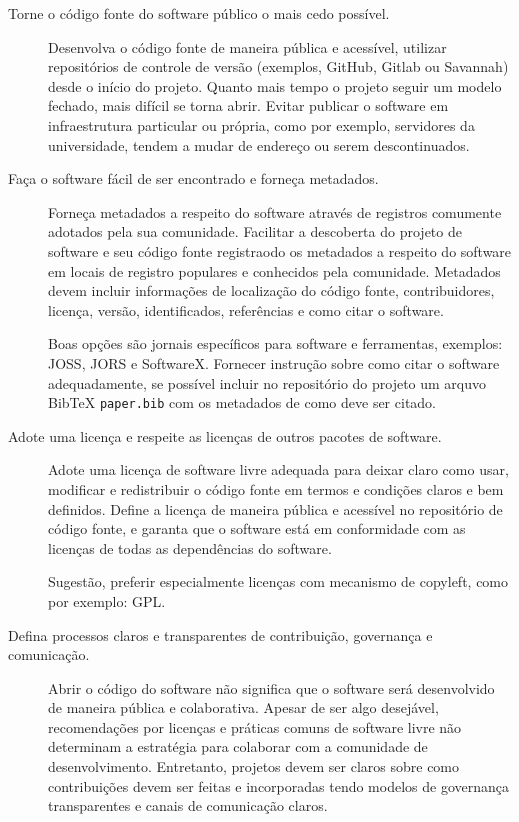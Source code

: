 \begin{description}
  \item [Torne o código fonte do software público o mais cedo possível.]

    Desenvolva o código fonte de maneira pública e acessível, utilizar
    repositórios de controle de versão (exemplos, GitHub, Gitlab ou Savannah)
    desde o início do projeto. Quanto mais tempo o projeto seguir um modelo
    fechado, mais difícil se torna abrir. Evitar publicar o software em
    infraestrutura particular ou própria, como por exemplo, servidores da
    universidade, tendem a mudar de endereço ou serem descontinuados.

  \item [Faça o software fácil de ser encontrado e forneça metadados.]

    Forneça metadados a respeito do software através de registros comumente
    adotados pela sua comunidade. Facilitar a descoberta do projeto de software
    e seu código fonte registraodo os metadados a respeito do software em
    locais de registro populares e conhecidos pela comunidade. Metadados devem
    incluir informações de localização do código fonte, contribuidores,
    licença, versão, identificados, referências e como citar o software.

    Boas opções são jornais específicos para software e ferramentas, exemplos:
    JOSS, JORS e SoftwareX. Fornecer instrução sobre como citar o software
    adequadamente, se possível incluir no repositório do projeto um arquvo
    BibTeX \texttt{paper.bib} com os metadados de como deve ser citado.

  \item [Adote uma licença e respeite as licenças de outros pacotes de software.]

    Adote uma licença de software livre adequada para deixar claro como usar,
    modificar e redistribuir o código fonte em termos e condições claros e bem
    definidos. Define a licença de maneira pública e acessível no repositório
    de código fonte, e garanta que o software está em conformidade com as
    licenças de todas as dependências do software.

    Sugestão, preferir especialmente licenças com mecanismo de copyleft, como
    por exemplo: GPL.

  \item [Defina processos claros e transparentes de contribuição, governança e \\ comunicação.]

    Abrir o código do software não significa que o software será desenvolvido
    de maneira pública e colaborativa. Apesar de ser algo desejável,
    recomendações por licenças e práticas comuns de software livre não
    determinam a estratégia para colaborar com a comunidade de desenvolvimento.
    Entretanto, projetos devem ser claros sobre como contribuições devem ser
    feitas e incorporadas tendo modelos de governança transparentes e canais de
    comunicação claros.

\end{description}

